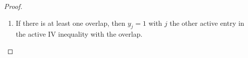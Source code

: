 \begin{proof}
\begin{enumerate}
\begin{enumerate}
          Indeed, the following linear dependence between the active constraints is obtained: adding the coefficient vectors of the two active IV inequalities and those of all active non-negativity constraints yields the same result as adding the coefficient vectors of the two normalization constraints.
          So we arrive at a contradiction.
        \item 
          If there is at least one overlap, 
          then $y_j=1$ with $j$ the other active entry in the active IV inequality with the overlap.

\end{enumerate}
\end{enumerate}
\end{proof}
